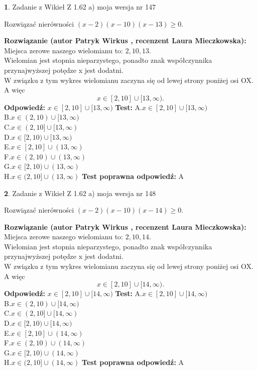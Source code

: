 \documentclass[12pt, a4paper]{article}
\theoremstyle{definition} %
\newtheorem{zad}{}
\newcommand{\zadStart}[1]{\begin{zad}#1\newline}
\newcommand{\zadStop}{\end{zad}}
\newcommand{\rozwStart}[2]{\noindent \textbf{Rozwiązanie (autor #1 , recenzent #2): }\newline}
\newcommand{\rozwStop}{\newline}
\newcommand{\odpStart}{\noindent \textbf{Odpowiedź:}\newline}
\newcommand{\odpStop}{\newline}
\newcommand{\testStart}{\noindent \textbf{Test:}\newline}
\newcommand{\testStop}{\newline}
\newcommand{\kluczStart}{\noindent \textbf{Test poprawna odpowiedź:}\newline}
\newcommand{\kluczStop}{\newline}
\begin{document}
\zadStart{Zadanie z Wikieł Z 1.62 a) moja wersja nr 147}

Rozwiązać nierówności $(x-2)(x-10)(x-13)\ge0$.
\zadStop
\rozwStart{Patryk Wirkus}{Laura Mieczkowska}
Miejsca zerowe naszego wielomianu to: $2, 10, 13$.\\
Wielomian jest stopnia nieparzystego, ponadto znak współczynnika przy\linebreak najwyższej potędze x jest dodatni.\\ W związku z tym wykres wielomianu zaczyna się od lewej strony poniżej osi OX. A więc $$x \in [2,10] \cup [13,\infty).$$
\rozwStop
\odpStart
$x \in [2,10] \cup [13,\infty)$
\odpStop
\testStart
A.$x \in [2,10] \cup [13,\infty)$\\
B.$x \in (2,10) \cup [13,\infty)$\\
C.$x \in (2,10] \cup [13,\infty)$\\
D.$x \in [2,10) \cup [13,\infty)$\\
E.$x \in [2,10] \cup (13,\infty)$\\
F.$x \in (2,10) \cup (13,\infty)$\\
G.$x \in [2,10) \cup (13,\infty)$\\
H.$x \in (2,10] \cup (13,\infty)$
\testStop
\kluczStart
A
\kluczStop



\zadStart{Zadanie z Wikieł Z 1.62 a) moja wersja nr 148}

Rozwiązać nierówności $(x-2)(x-10)(x-14)\ge0$.
\zadStop
\rozwStart{Patryk Wirkus}{Laura Mieczkowska}
Miejsca zerowe naszego wielomianu to: $2, 10, 14$.\\
Wielomian jest stopnia nieparzystego, ponadto znak współczynnika przy\linebreak najwyższej potędze x jest dodatni.\\ W związku z tym wykres wielomianu zaczyna się od lewej strony poniżej osi OX. A więc $$x \in [2,10] \cup [14,\infty).$$
\rozwStop
\odpStart
$x \in [2,10] \cup [14,\infty)$
\odpStop
\testStart
A.$x \in [2,10] \cup [14,\infty)$\\
B.$x \in (2,10) \cup [14,\infty)$\\
C.$x \in (2,10] \cup [14,\infty)$\\
D.$x \in [2,10) \cup [14,\infty)$\\
E.$x \in [2,10] \cup (14,\infty)$\\
F.$x \in (2,10) \cup (14,\infty)$\\
G.$x \in [2,10) \cup (14,\infty)$\\
H.$x \in (2,10] \cup (14,\infty)$
\testStop
\kluczStart
A
\kluczStop
\end{document}
